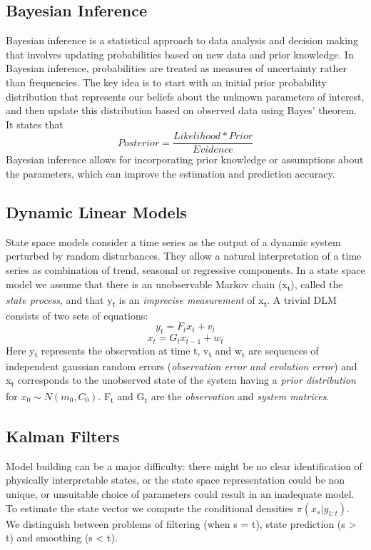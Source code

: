 \documentclass[a4paper,12pt]{article}
\begin{document}
\subsection{Bayesian Inference}
\label{sec:org63b7cb3}
Bayesian inference is a statistical approach to data analysis and decision making that involves updating probabilities based on new data and prior knowledge. In Bayesian inference, probabilities are treated as measures of uncertainty rather than frequencies. The key idea is to start with an initial prior probability distribution that represents our beliefs about the unknown parameters of interest, and then update this distribution based on observed data using Bayes' theorem. It states that
\[
  Posterior = \frac{Likelihood * Prior}{Evidence}
\]
Bayesian inference allows for incorporating prior knowledge or assumptions about the parameters, which can improve the estimation and prediction accuracy.
\subsection{Dynamic Linear Models}
\label{sec:org3c267f3}
State space models consider a time series as the output of a dynamic system perturbed by random disturbances. They allow a natural interpretation of a time series as combination of trend, seasonal or regressive components. In a state space model we assume that there is an unobservable Markov chain (x\textsubscript{t}), called the \emph{state process}, and that y\textsubscript{t} is an \emph{imprecise measurement} of x\textsubscript{t}. A trivial DLM consists of two sets of equations:
\[
y_{t} = F_{t}x_{t} + v_{t}
\]
\[
x_{t} = G_{t}x_{t-1} + w_{t}
\]
Here y\textsubscript{t} represents the observation at time t, v\textsubscript{t} and w\textsubscript{t} are sequences of independent gaussian random errors (\emph{observation error and evolution error}) and x\textsubscript{t} corresponds to the unobserved state of the system having a \emph{prior distribution} for \(x_{0} \sim N(m_{0}, C_{0})\). F\textsubscript{t} and G\textsubscript{t} are the \emph{observation} and \emph{system matrices}.
\subsection{Kalman Filters}
\label{sec:org66792b1}
Model building can be a major difficulty: there might be no clear identiﬁcation of physically interpretable states, or the state space representation could be non unique, or unsuitable choice of parameters could result in an inadequate model. To estimate the state vector we compute the conditional densities \(\pi(x_{s}|y_{1:t})\). We distinguish between problems of filtering (when s = t), state prediction (s > t) and smoothing (s < t).
\end{document}
